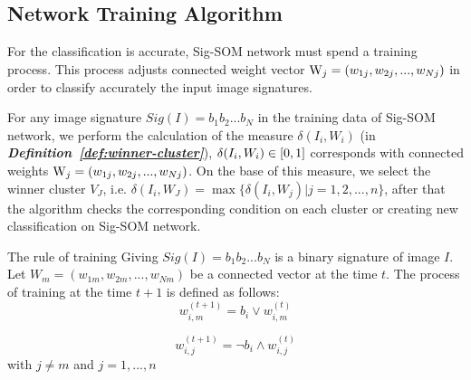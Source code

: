 \documentclass{amcs}
\begin{document}
\subsection{Network Training Algorithm}
For the classification is accurate, Sig-SOM network must spend a training process. This process adjusts connected weight vector ${{\rm{W}}_j} = ({w_{1j}},{w_{2j}},...,{w_{Nj}})$ in order to classify accurately the input image signatures. 

For any image signature $Sig(I) = {b_1}{b_2}...{b_N}$ in the training data of Sig-SOM network, we perform the calculation of the measure $\delta ({I_i},{W_i})$ (in \textit{\textbf{Definition~\ref{def:winner-cluster}}}), $\delta ({I_i},{W_i}) \in {\rm{[}}0,1]$ corresponds with connected weights ${{\rm{W}}_j} = ({w_{1j}},{w_{2j}},...,{w_{Nj}})$. On the base of this measure, we select the winner cluster ${V_J}$, i.e. $\delta ({I_i},{W_J}) = \max \{ \delta ({I_i},{W_j})|j = 1,2,...,n\} $, after that the algorithm checks the corresponding condition on each cluster or creating new classification on Sig-SOM network.
\begin{definition}{The rule of training}
Giving $Sig(I) = {b_1}{b_2}...{b_N}$ is a binary signature of image $I$. Let ${W_m} = ({w_{1m}},{w_{2m}},...,{w_{Nm}})$ be a connected vector at the time $t$. The process of training at the time $t + 1$ is defined as follows:
\begin{equation}
w_{i,m}^{(t + 1)} = {b_i} \vee w_{i,m}^{(t)}
\end{equation}

\begin{equation}
w_{i,j}^{(t + 1)} = \neg {b_i} \wedge w_{i,j}^{(t)}
\end{equation}
with $j \ne m$ and $j = 1,...,n$
\end{definition}
\end{document}
